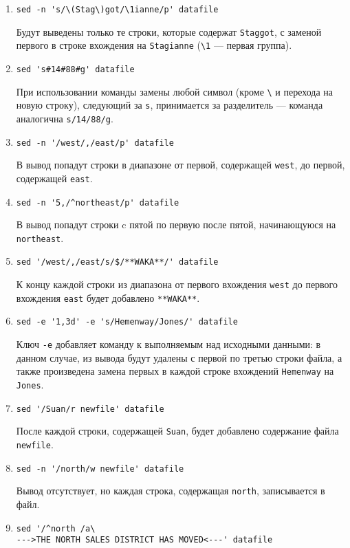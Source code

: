 \documentclass[listings]{labreport}
\begin{document}
\begin{enumerate}
\item \verb|sed -n 's/\(Stag\)got/\1ianne/p' datafile|

Будут выведены только те строки, которые содержат \verb|Staggot|, с заменой первого
в строке вхождения на \verb|Stagianne| (\verb|\1| — первая группа).

\item \verb|sed 's#14#88#g' datafile|

При использовании команды замены любой символ (кроме \verb|\| и перехода на новую строку),
следующий за \verb|s|, принимается за разделитель — команда аналогична \verb|s/14/88/g|.

\item \verb|sed -n '/west/,/east/p' datafile|

В вывод попадут строки в диапазоне от первой, содержащей \verb|west|, до первой, содержащей
\verb|east|.

\item \verb|sed -n '5,/^northeast/p' datafile|

В вывод попадут строки c пятой по первую после пятой, начинающуюся на \verb|northeast|.

\item \verb|sed '/west/,/east/s/$/**WAKA**/' datafile|

К концу каждой строки из диапазона от первого вхождения \verb|west| до первого вхождения
\verb|east| будет добавлено \verb|**WAKA**|.

\item \verb|sed -e '1,3d' -e 's/Hemenway/Jones/' datafile|

Ключ \verb|-e| добавляет команду к выполняемым над исходными данными: в данном случае,
из вывода будут удалены с первой по третью строки файла, а также произведена
замена первых в каждой строке вхождений \verb|Hemenway| на \verb|Jones|.

\item \verb|sed '/Suan/r newfile' datafile|

После каждой строки, содержащей \verb|Suan|, будет добавлено содержание файла \verb|newfile|.

\item \verb|sed -n '/north/w newfile' datafile|

Вывод отсутствует, но каждая строка, содержащая \verb|north|, записывается в файл.

\item \begin{verbatim}
sed '/^north /a\
--->THE NORTH SALES DISTRICT HAS MOVED<---' datafile
\end{verbatim}


\end{enumerate}
\end{document}
